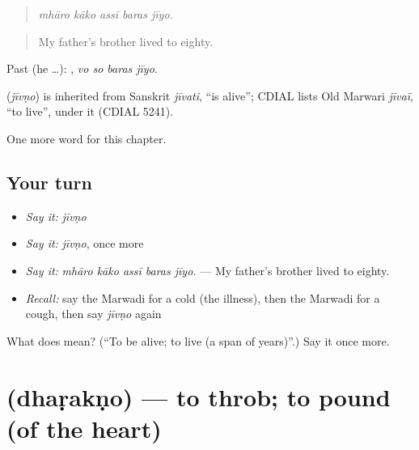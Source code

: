 \begin{quote}
    
\end{quote}

\begin{quote}
\emph{mhāro kāko assī baras jīyo.}
\end{quote}

\begin{quote}
My father's brother lived to eighty.
\end{quote}

Past (he …):    , \emph{vo so baras jīyo}.

\begin{cousinweb}
\textbf{} (\emph{jīvṇo}) is inherited from Sanskrit \emph{jīvati}, \textquotedblleft{}is alive\textquotedblright{}; CDIAL lists Old Marwari \emph{jīvaï}, \textquotedblleft{}to live\textquotedblright{}, under it (CDIAL 5241).
\end{cousinweb}

\begin{grammarlens}[title={What you've built}]
One more word for this chapter.
\end{grammarlens}

\subsection*{Your turn}
\begin{itemize}
\raggedright
  \item \emph{Say it:} \emph{jīvṇo}
  \item \emph{Say it:} \emph{jīvṇo}, once more
  \item \emph{Say it:} \emph{mhāro kāko assī baras jīyo.} — My father's brother lived to eighty.
  \item \emph{Recall:} say the Marwadi for a cold (the illness), then the Marwadi for a cough, then say \emph{jīvṇo} again
\end{itemize}

\begin{tcolorbox}[breakable,colback=teal!4,colframe=teal!35!black,title={Before you move on}]
What does  mean? (\textquotedblleft{}To be alive; to live (a span of years)\textquotedblright{}.) Say it once more.
\end{tcolorbox}
\section[\texorpdfstring{\mw{धड़कणो} (dhaṛakṇo)}{धड़कणो (dhaṛakṇo)}]{ (dhaṛakṇo) — to throb; to pound (of the heart)}


